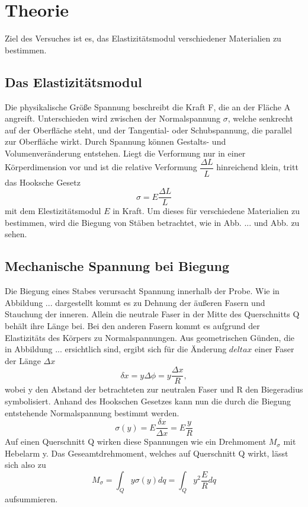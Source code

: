 \section{Theorie}
\label{sec:Theorie}

Ziel des Versuches ist es, das Elastizitätsmodul verschiedener Materialien zu bestimmen.

\subsection{Das Elastizitätsmodul}
    Die physikalische Größe Spannung beschreibt die Kraft F, die an der Fläche A
    angreift. Unterschieden wird zwischen der Normalspannung $\sigma$, welche 
    senkrecht auf der Oberfläche steht, und der Tangential- oder Schubspannung, die parallel 
    zur Oberfläche wirkt. Durch Spannung können Gestalts- und Volumenveränderung entstehen.
    Liegt die Verformung nur in einer Körperdimension vor und ist die relative 
    Verformung $\dfrac{\Delta L}{L}$ hinreichend klein, tritt das Hooksche Gesetz
    \begin{equation}
        \label{eqn:Hook}
        \sigma = E \dfrac{\Delta L}{L}
    \end{equation}
    mit dem Elestizitätsmodul $E$ in Kraft. Um dieses für verschiedene Materialien zu bestimmen, 
    wird die Biegung von Stäben betrachtet, wie in Abb. ... und Abb. zu sehen.

\subsection{Mechanische Spannung bei Biegung}
    \label{sec:aiaiai}
    Die Biegung eines Stabes verursacht Spannung innerhalb der Probe. Wie in Abbildung ...
    dargestellt kommt es zu Dehnung der äußeren Fasern und Stauchung der inneren. 
    Allein die neutrale Faser in der Mitte des Querschnitts Q behält ihre Länge bei.
    Bei den anderen Fasern kommt es aufgrund der Elastizitäts des Körpers zu Normalspannungen.
    Aus geometrischen Günden, die in Abbildung ... ersichtlich sind, ergibt sich für die 
    Änderung $delta x$ einer Faser der Länge $\Delta x$
    \begin{equation*}
        \delta x = y \Delta \phi= y\dfrac{\Delta x}{R},
    \end{equation*}
    wobei y den Abstand der betrachteten zur neutralen Faser und R den Biegeradius
    symbolisiert. Anhand des Hookschen Gesetzes kann nun die durch die Biegung 
    entstehende Normalspannung bestimmt werden.
    \begin{equation*}
        \sigma(y)=E\dfrac{\delta x}{\Delta x}=E \dfrac{y}{R}
    \end{equation*}
    Auf einen Querschnitt Q wirken diese Spannungen wie ein Drehmoment $M_{\sigma}$ mit
    Hebelarm y. Das Geseamtdrehmoment, welches auf Querschnitt Q wirkt, lässt sich also 
    zu
    \begin{equation}
        \label{eqn:fuckyou}
        M_{\sigma}=\int_Q y \sigma(y)dq = \int_Q y^2 \dfrac{E}{R}dq 
    \end{equation}
    aufsummieren. 
    

